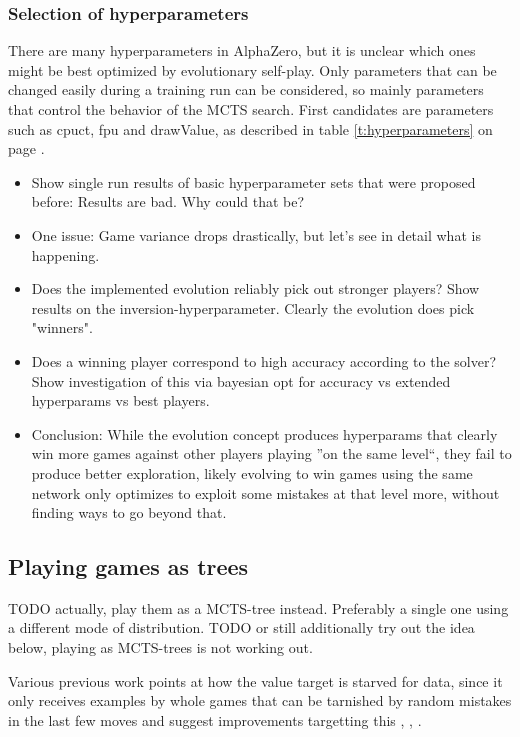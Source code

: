 \documentclass[12pt,onecolumn,oneside,titlepage]{article}
\begin{document}
\subsubsection{Selection of hyperparameters}

There are many hyperparameters in AlphaZero, but it is unclear which ones might be best optimized by evolutionary self-play. Only parameters that can be changed easily during a training run can be considered, so mainly parameters that control the behavior of the MCTS search.
First candidates are parameters such as cpuct, fpu and drawValue, as described in table \ref{t:hyperparameters} on page \pageref{t:hyperparameters}.



\begin{itemize}
 \item Show single run results of basic hyperparameter sets that were proposed before: Results are bad. Why could that be?
 \item One issue: Game variance drops drastically, but let's see in detail what is happening.
 \item Does the implemented evolution reliably pick out stronger players? Show results on the inversion-hyperparameter. Clearly the evolution does pick "winners".
 \item Does a winning player correspond to high accuracy according to the solver? Show investigation of this via bayesian opt for accuracy vs extended hyperparams vs best players.
 \item Conclusion: While the evolution concept produces hyperparams that clearly win more games against other players playing ''on the same level``, they fail to produce better exploration, likely evolving to win games using the same network
 only optimizes to exploit some mistakes at that level more, without finding ways to go beyond that.
 \end{itemize}


\subsection{Playing games as trees}

TODO actually, play them as a MCTS-tree instead. Preferably a single one using a different mode of distribution.
TODO or still additionally try out the idea below, playing as MCTS-trees is not working out.

Various previous work points at how the value target is starved for data, since it only receives examples by whole games that can be tarnished by random mistakes in the last few moves and suggest improvements targetting this \cite{wu2019accelerating}, \cite{oracledevs6}, \cite{lan2019multiple}.
\end{document}
